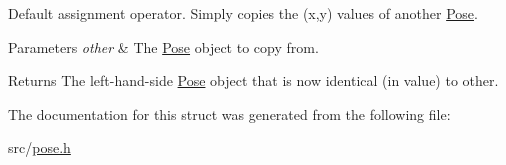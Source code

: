 Default assignment operator. Simply copies the (x,y) values of another \hyperlink{structPose}{Pose}. 


\begin{DoxyParams}{Parameters}
{\em other} & The \hyperlink{structPose}{Pose} object to copy from.\\
\hline
\end{DoxyParams}
\begin{DoxyReturn}{Returns}
The left-\/hand-\/side \hyperlink{structPose}{Pose} object that is now identical (in value) to {\ttfamily other}. 
\end{DoxyReturn}


The documentation for this struct was generated from the following file\+:\begin{DoxyCompactItemize}
\item 
src/\hyperlink{pose_8h}{pose.\+h}\end{DoxyCompactItemize}
